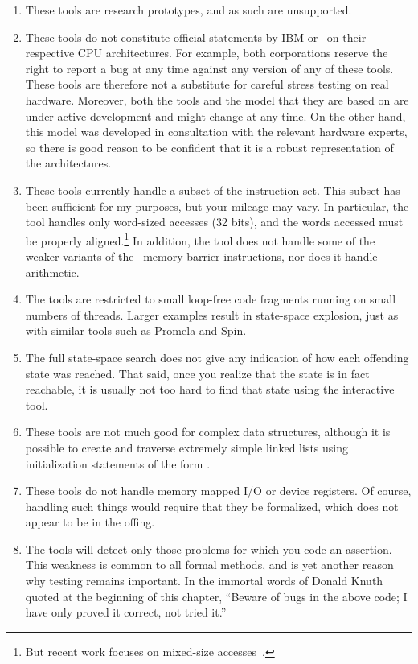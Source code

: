 \begin{enumerate}
\item	These tools are research prototypes, and as such are unsupported.
\item	These tools do not constitute official statements by IBM or \ARM\
	on their respective CPU architectures. For example, both
	corporations reserve the right to report a bug at any time against
	any version of any of these tools. These tools are therefore not a
	substitute for careful stress testing on real hardware. Moreover,
	both the tools and the model that they are based on are under
	active development and might change at any time. On the other
	hand, this model was developed in consultation with the relevant
	hardware experts, so there is good reason to be confident that
	it is a robust representation of the architectures.
\item	These tools currently handle a subset of the instruction set.
	This subset has been sufficient for my purposes, but your mileage
	may vary. In particular, the tool handles only word-sized accesses
	(32 bits), and the words accessed must be properly aligned.\footnote{
		But recent work focuses on mixed-size
		accesses~\cite{Flur:2017:MCA:3093333.3009839}.}
	In addition, the tool does not handle some of the weaker variants
	of the \ARM\ memory-barrier instructions, nor does it handle
	arithmetic.
\item	The tools are restricted to small loop-free code fragments
	running on small numbers of threads. Larger examples result
	in state-space explosion, just as with similar tools such as
	Promela and Spin.
\item	The full state-space search does not give any indication of how
	each offending state was reached. That said, once you realize
	that the state is in fact reachable, it is usually not too hard
	to find that state using the interactive tool.
\item	These tools are not much good for complex data structures, although
	it is possible to create and traverse extremely simple linked
	lists using initialization statements of the form
	.
\item	These tools do not handle memory mapped I/O or device registers.
	Of course, handling such things would require that they be
	formalized, which does not appear to be in the offing.
\item	The tools will detect only those problems for which you code an
	assertion. This weakness is common to all formal methods, and
	is yet another reason why testing remains important. In the
	immortal words of Donald Knuth quoted at the beginning of this
	chapter, ``Beware of bugs in the above
	code; I have only proved it correct, not tried it.''
\end{enumerate}

